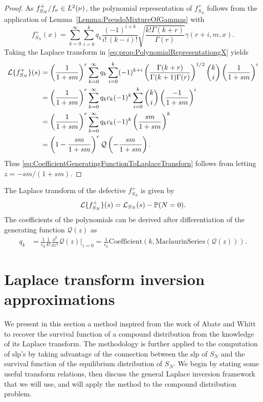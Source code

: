 \begin{proof}
As $f_{S_N}^+/f_{\nu}\in L^{2}(\nu)$, the polynomial representation of $f_{S_N}^+$ follows from the application of Lemma~\ref{Lemma:PseudoMixtureOfGammas} with
\begin{equation}\label{eq:prop:PolynomialRepresentationgX}
f_{S_N}^+(x)=\sum_{k=0}^{\infty}\sum_{i=0}^{k}q_k\frac{(-1)^{i+k}}{i! \, (k-i)!} \sqrt{\frac{k! \Gamma(k+r)}{\Gamma(r)}}\gamma(r+i,m,x).
\end{equation}
Taking the Laplace transform in \eqref{eq:prop:PolynomialRepresentationgX} yields
\begin{align*} %
\LT{f_{S_N}^+}(s)
&= \left(\frac{1}{1+sm}\right)^{r}\sum_{k=0}^{\infty}q_k \sum_{i=0}^{k} (-1)^{k+i} \left(\frac{\Gamma(k+r)}{\Gamma(k+1)\Gamma(r)}\right)^{1/2} \binom{k}{i} \left(\frac{1}{1+sm}\right)^{i}\nonumber \\
&= \left(\frac{1}{1+sm}\right)^{r}\sum_{k=0}^{\infty}q_k c_k (-1)^{k} \sum_{i=0}^{k} \binom{k}{i} \left(\frac{-1}{1+sm}\right)^{i} \nonumber\\
&= \left(\frac{1}{1+sm}\right)^{r}\sum_{k=0}^{\infty}q_k c_k (-1)^{k} \left( \frac{sm}{1+sm}  \right)^{k}\nonumber \\
&= \left( 1 - \frac{sm}{1+sm}\right)^{r}\mathcal{Q}\left(-\frac{sm}{1+sm}\right).
\end{align*}
Thus \eqref{eq:CoefficientGeneratingFunctionToLaplaceTransforn} follows from letting $z= -sm / (1+sm)$.
\end{proof}
The Laplace transform of the defective \pdf $f_{S_N}^{+}$ is given by 
$$
\mathcal{L}\{f_{S_N}^{+}\}(s)=\mathcal{L}_{S_N}(s)-\mathbb{P}(N=0).
$$
The coefficients of the polynomials can be derived after differentiation of the generating function $\mathcal{Q}(z)$ as
\begin{align*}\label{eq:PolynomialExpansionCoefficientDerivativeGeneratingFunction}
q_k&=\frac{1}{c_k}\frac{1}{k!}\frac{\dd^{k}}{\dd z^{k}}\mathcal{Q}(z)\Big\rvert_{z=0}  =\frac{1}{c_k} \text{Coefficient}(k, \text{MaclaurinSeries}(\mathcal{Q}(z))).
\end{align*}



\section{Laplace transform inversion approximations}\label{sec:NumericalInversionLaplaceTransform}
We present in this section a method inspired from the work of Abate and Whitt \cite{AbWh92} to recover the survival function of a compound distribution from the knowledge of its Laplace transform. The methodology is further applied to the computation of slp's by taking advantage of the connection between the slp of $S_N$ and the survival function of the equilibrium distribution of $S_N$. We begin by stating some useful transform relations, then discuss the general Laplace inversion framework that we will use, and will apply the method to the compound distribution problem.

